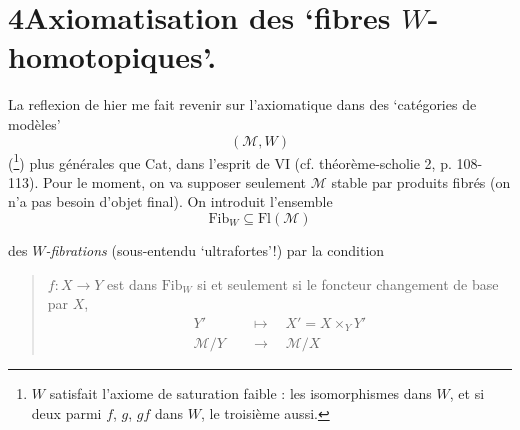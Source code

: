 \documentclass[11pt]{article}
\newcommand{\msp}[1]{\marginpar{\footnotesize [#1]}}
\begin{document}
\section*{4\quad Axiomatisation des ‘fibres $W$-homotopiques’.}

La reflexion de hier me fait revenir sur l'axiomatique dans des ‘catégories de modèles’ %
\[
(\mathcal{M}, W)
\]
(\footnote[119]{$W$ satisfait l'axiome de saturation faible : les isomorphismes dans $W$, et si deux parmi $f$, $g$, $gf$ dans $W$, le troisième aussi.}) plus générales que Cat, dans l'esprit de VI (cf. théorème-scholie 2, p. 108-113). Pour le moment, on va supposer seulement $\mathcal{M}$ stable par produits fibrés (on n'a pas besoin d'objet final). On introduit l'ensemble
\[
\mathrm{Fib}_W \subseteq \mathrm{Fl}(\mathcal{M})
\]

\msp{page 208}des \textit{$W$-fibrations} (sous-entendu ‘ultrafortes’!) par la condition

\begin{quote}
$f : X \longrightarrow Y$ est dans $\mathrm{Fib}_W$ si et seulement si le foncteur changement de base par $X$,
\[
\begin{aligned}
Y' &\quad\longmapsto\quad X' = X \times_Y Y' \\
\mathcal{M}/Y &\quad\longrightarrow\quad \mathcal{M}/X
\end{aligned}
\]
\end{quote}
\end{document}
